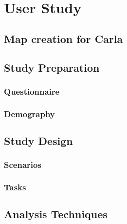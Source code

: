 
\chapter{User Study}\label{chapter:userstudy}

\section{Map creation for Carla}

\section{Study Preparation}
\subsection{Questionnaire}
\subsection{Demography}

\section{Study Design}
\subsection{Scenarios}
\subsection{Tasks}

\section{Analysis Techniques}
